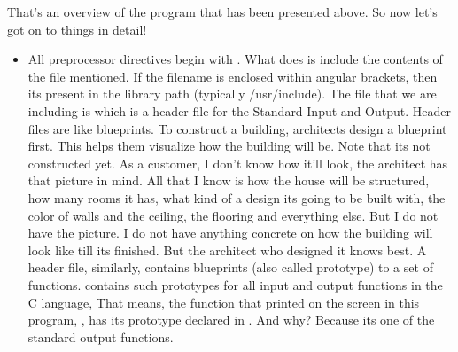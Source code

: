 That's an overview of the program that has been presented above. So now let's got on to things in detail!

\begin{itemize}
\item All preprocessor directives begin with \hilight{\#}. What  does is include the contents of the file mentioned. If the filename is enclosed within angular brackets, then its present in the library path (typically /usr/include). The file that we are including is  which is a header file for the Standard Input and Output. Header files are like blueprints. To construct a building, architects design a blueprint first. This helps them visualize how the building will be. Note that its not constructed yet. As a customer, I don't know how it'll look, the architect has that picture in mind. All that I know is how the house will be structured, how many rooms it has, what kind of a design its going to be built with, the color of walls and the ceiling, the flooring and everything else. But I do not have the picture. I do not have anything concrete on how the building will look like till its finished. But the architect who designed it knows best. A header file, similarly, contains blueprints (also called prototype) to a set of functions.  contains such prototypes for all input and output functions in the C language, That means, the function that printed on the screen in this program, , has its prototype declared in . And why? Because its one of the standard output functions.
\end{itemize}
